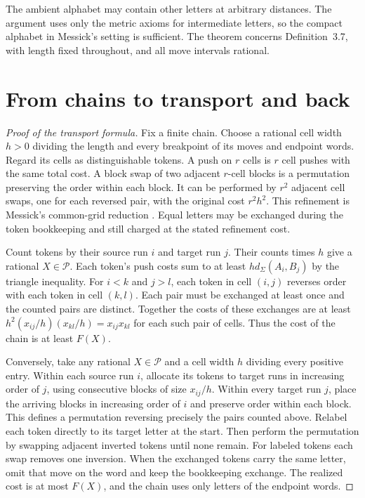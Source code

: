 \documentclass[11pt,a4paper]{amsart}
\newcommand{\dd}{d_\Sigma}
\begin{document}
The ambient alphabet may contain other letters at arbitrary distances. The argument uses only the metric axioms for intermediate letters, so the compact alphabet in Messick's setting is sufficient. The theorem concerns Definition~3.7, with length fixed throughout, and all move intervals rational.

\section{From chains to transport and back}

\begin{proof}[Proof of the transport formula]
Fix a finite chain. Choose a rational cell width \(h>0\) dividing the length and every breakpoint of its moves and endpoint words. Regard its cells as distinguishable tokens. A push on \(r\) cells is \(r\) cell pushes with the same total cost. A block swap of two adjacent \(r\)-cell blocks is a permutation preserving the order within each block. It can be performed by \(r^2\) adjacent cell swaps, one for each reversed pair, with the original cost \(r^2h^2\). This refinement is Messick's common-grid reduction \cite[Observations~3.10--3.11]{messick}. Equal letters may be exchanged during the token bookkeeping and still charged at the stated refinement cost.

Count tokens by their source run \(i\) and target run \(j\). Their counts times \(h\) give a rational \(X\in\mathcal P\). Each token's push costs sum to at least \(h\dd(A_i,B_j)\) by the triangle inequality. For \(i<k\) and \(j>l\), each token in cell \((i,j)\) reverses order with each token in cell \((k,l)\). Each pair must be exchanged at least once and the counted pairs are distinct. Together the costs of these exchanges are at least
\(
h^2(x_{ij}/h)(x_{kl}/h)=x_{ij}x_{kl}
\)
for each such pair of cells. Thus the cost of the chain is at least \(F(X)\).

Conversely, take any rational \(X\in\mathcal P\) and a cell width \(h\) dividing every positive entry. Within each source run \(i\), allocate its tokens to target runs in increasing order of \(j\), using consecutive blocks of size \(x_{ij}/h\). Within every target run \(j\), place the arriving blocks in increasing order of \(i\) and preserve order within each block. This defines a permutation reversing precisely the pairs counted above. Relabel each token directly to its target letter at the start. Then perform the permutation by swapping adjacent inverted tokens until none remain. For labeled tokens each swap removes one inversion. When the exchanged tokens carry the same letter, omit that move on the word and keep the bookkeeping exchange. The realized cost is at most \(F(X)\), and the chain uses only letters of the endpoint words.


\end{proof}
\end{document}
